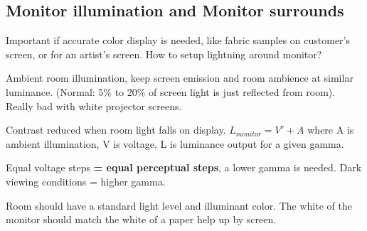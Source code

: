 \begin{mdframed}
\subsection{Monitor illumination and Monitor surrounds}
Important if accurate color display is needed, like fabric samples on
customer's screen, or for an artist's screen. How to setup lightning around
monitor?
\begin{compactdesc}
    \item[Ambient room illumination,] keep screen emission and room ambience
        at similar luminance. (Normal: 5\% to 20\% of screen light is just
        reflected from room). Really bad with white projector screens.
    \item{Contrast reduced} when room light falls on display.
        $L_{monitor} = V^r + A$ where A is ambient illumination, V
        is voltage, L is luminance output for a given gamma.
    \item{Equal voltage steps} \textbf{= equal perceptual steps}, a lower
        gamma is needed. Dark viewing conditions = higher gamma.
    \item{Room} should have a standard light level and illuminant color.
        The white of the monitor should match the white of a paper help up by
        screen.
\end{compactdesc}

\begin{multicols}{2}

\end{multicols}\end{mdframed}
